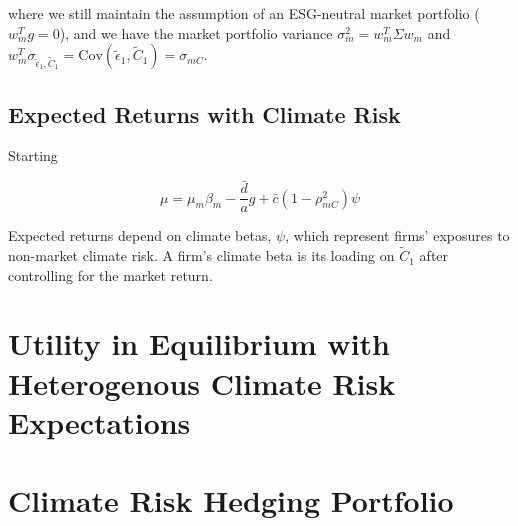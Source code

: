 where we still maintain the assumption of an ESG-neutral market portfolio ($w_m^Tg = 0$),
and we have the market portfolio variance 
$\sigma^2_m = w_m^T \Sigma w_m$ and 
$w_m^T \sigma_{\tilde{\epsilon}_1, \tilde{C}_1} = \text{Cov}(\tilde{\epsilon}_1, \tilde{C}_1) = \sigma_{mC}$.

\subsection{Expected Returns with Climate Risk}

Starting 

\begin{equation}
    \mu = \mu_m \beta_m - \frac{\bar{d}}{a}g + \bar{c}(1 - \rho^2_{mC}) \psi 
\end{equation}

Expected returns depend on climate betas, $\psi$, which represent 
firms' exposures to non-market climate risk. A firm's climate 
beta is its loading on $\tilde{C}_1$ after controlling for the market return. 


\section{Utility in Equilibrium with Heterogenous 
Climate Risk Expectations}

\section{Climate Risk Hedging Portfolio}
